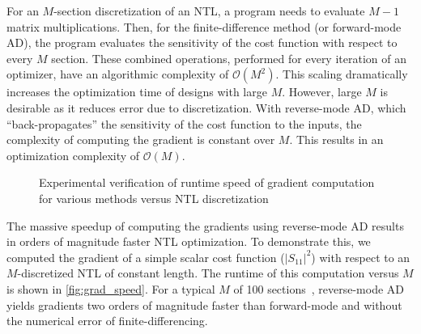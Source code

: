 For an $M$-section discretization of an NTL, a program needs to evaluate $M-1$ matrix multiplications.
Then, for the finite-difference method (or forward-mode AD), the program evaluates the sensitivity of the cost function with respect to every $M$ section.
These combined operations, performed for every iteration of an optimizer, have an algorithmic complexity of $\mathcal{O}(M^2)$.
This scaling dramatically increases the optimization time of designs with large $M$.
However, large $M$ is desirable as it reduces error due to discretization.
With reverse-mode AD, which “back-propagates” the sensitivity of the cost function to the inputs, the complexity of computing the gradient is constant over $M$.
This results in an optimization complexity of $\mathcal{O}(M)$.

\begin{figure}[t]
	\centering
	\caption{Experimental verification of runtime speed of gradient computation for various methods versus NTL discretization}
	\label{fig:grad_speed}
\end{figure}

The massive speedup of computing the gradients using reverse-mode AD results in orders of magnitude faster NTL optimization.
To demonstrate this, we computed the gradient of a simple scalar cost function ($|S_{11}|^2$) with respect to an $M$-discretized NTL of constant length.
The runtime of this computation versus $M$ is shown in \autoref{fig:grad_speed}.
For a typical $M$ of \num{100} sections~\cite{raeAnalysisStraightTapered1977}, reverse-mode AD yields gradients two orders of magnitude faster than forward-mode and without the numerical error of finite-differencing.

